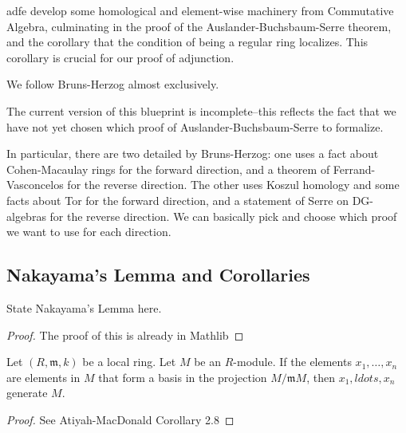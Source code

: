adfe develop some 
homological and element-wise machinery
from Commutative Algebra, culminating 
in the proof of the Auslander-Buchsbaum-Serre 
theorem, and 
the corollary that the condition of being 
a regular ring localizes. 
This corollary is crucial for our proof of adjunction.

We follow Bruns-Herzog almost exclusively.

The current version of this blueprint is incomplete--this
reflects the fact that we have not yet chosen which proof
of Auslander-Buchsbaum-Serre to formalize.

In particular, there are two detailed by Bruns-Herzog:
one uses a fact about Cohen-Macaulay rings for the forward
direction, and a theorem of Ferrand-Vasconcelos for the
reverse direction. 
The other uses Koszul homology and some facts about Tor
for the forward direction, and a statement of Serre 
on DG-algebras for the reverse direction.
We can basically pick and choose which proof we want to use
for each direction.



\subsection{Nakayama's Lemma and Corollaries}

\begin{lemma}
  \label{lem:nakayama}
  State Nakayama's Lemma here.
\end{lemma}

\begin{proof}
  The proof of this is already in Mathlib
\end{proof}

\begin{corollary}
  \label{cor:local_maximal_gereating_set_basis_residue}
  Let $(R,\mathfrak{m},k)$ be a local ring. 
  Let $M$ be an $R$-module.
  If the elements $x_1, \ldots, x_n$ are elements in
  $M$ that form a basis in the projection 
  $M / \mathfrak{m} M$, then $x_1, ldots, x_n$ generate $M$.
\end{corollary}

\begin{proof}
  See Atiyah-MacDonald Corollary 2.8
\end{proof}

